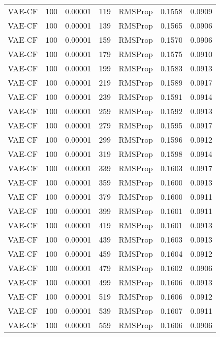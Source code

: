 \begin{tabular}{llrllrr}
  VAE-CF &  100 &  0.00001 &   119 &   RMSProp &  0.1558 &       0.0909 \\
  VAE-CF &  100 &  0.00001 &   139 &   RMSProp &  0.1565 &       0.0906 \\
  VAE-CF &  100 &  0.00001 &   159 &   RMSProp &  0.1570 &       0.0906 \\
  VAE-CF &  100 &  0.00001 &   179 &   RMSProp &  0.1575 &       0.0910 \\
  VAE-CF &  100 &  0.00001 &   199 &   RMSProp &  0.1583 &       0.0913 \\
  VAE-CF &  100 &  0.00001 &   219 &   RMSProp &  0.1589 &       0.0917 \\
  VAE-CF &  100 &  0.00001 &   239 &   RMSProp &  0.1591 &       0.0914 \\
  VAE-CF &  100 &  0.00001 &   259 &   RMSProp &  0.1592 &       0.0913 \\
  VAE-CF &  100 &  0.00001 &   279 &   RMSProp &  0.1595 &       0.0917 \\
  VAE-CF &  100 &  0.00001 &   299 &   RMSProp &  0.1596 &       0.0912 \\
  VAE-CF &  100 &  0.00001 &   319 &   RMSProp &  0.1598 &       0.0914 \\
  VAE-CF &  100 &  0.00001 &   339 &   RMSProp &  0.1603 &       0.0917 \\
  VAE-CF &  100 &  0.00001 &   359 &   RMSProp &  0.1600 &       0.0913 \\
  VAE-CF &  100 &  0.00001 &   379 &   RMSProp &  0.1600 &       0.0911 \\
  VAE-CF &  100 &  0.00001 &   399 &   RMSProp &  0.1601 &       0.0911 \\
  VAE-CF &  100 &  0.00001 &   419 &   RMSProp &  0.1601 &       0.0913 \\
  VAE-CF &  100 &  0.00001 &   439 &   RMSProp &  0.1603 &       0.0913 \\
  VAE-CF &  100 &  0.00001 &   459 &   RMSProp &  0.1604 &       0.0912 \\
  VAE-CF &  100 &  0.00001 &   479 &   RMSProp &  0.1602 &       0.0906 \\
  VAE-CF &  100 &  0.00001 &   499 &   RMSProp &  0.1606 &       0.0913 \\
  VAE-CF &  100 &  0.00001 &   519 &   RMSProp &  0.1606 &       0.0912 \\
  VAE-CF &  100 &  0.00001 &   539 &   RMSProp &  0.1607 &       0.0911 \\
  VAE-CF &  100 &  0.00001 &   559 &   RMSProp &  0.1606 &       0.0906 \\

\end{tabular}
